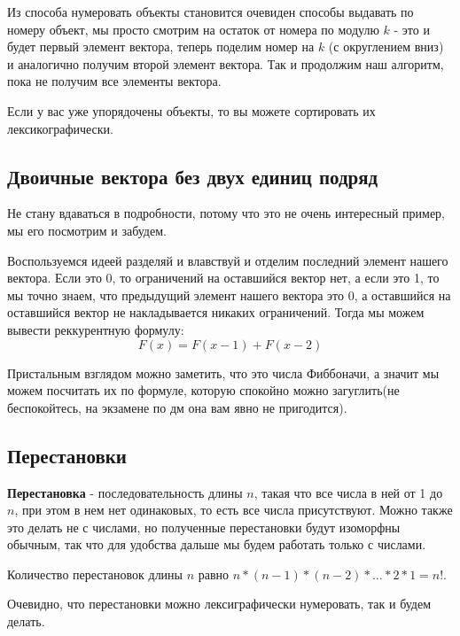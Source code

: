 Из способа нумеровать объекты становится очевиден способы выдавать по номеру объект, мы просто смотрим на остаток от номера по модулю $k$ - это и будет первый элемент вектора, теперь поделим номер на $k$ (с округлением вниз) и аналогично получим второй элемент вектора. Так и продолжим наш алгоритм, пока не получим все элементы вектора.

Если у вас уже упорядочены объекты, то вы можете сортировать их лексикографически.

\subsection{Двоичные вектора без двух единиц подряд}
Не стану вдаваться в подробности, потому что это не очень интересный пример, мы его посмотрим и забудем.

Воспользуемся идеей разделяй и влавствуй и отделим последний элемент нашего вектора. Если это 0, то ограничений на оставшийся вектор нет, а если это 1, то мы точно знаем, что предыдущий элемент нашего вектора это 0, а оставшийся на оставшийся вектор не накладывается никаких ограничений. Тогда мы можем вывести реккурентную формулу: $$F(x) = F(x-1)+F(x-2)$$

Пристальным взглядом можно заметить, что это числа Фиббоначи, а значит мы можем посчитать их по формуле, которую спокойно можно загуглить(не беспокойтесь, на экзамене по дм она вам явно не пригодится).

\subsection{Перестановки}
\textbf{Перестановка} - последовательность длины $n$, такая что все числа в ней от 1 до $n$, при этом в нем нет одинаковых, то есть все числа присутствуют. Можно также это делать не с числами, но полученные перестановки будут изоморфны обычным, так что для удобства дальше мы будем работать только с числами.

Количество перестановок длины $n$ равно $n * (n-1)*(n-2)*\dots *2*1 = n!$.

Очевидно, что перестановки можно лексиграфически нумеровать, так и будем делать.

